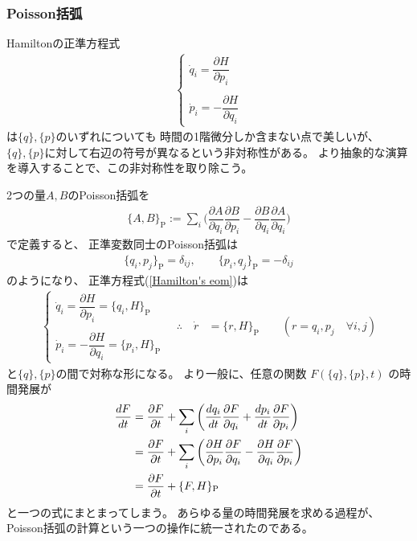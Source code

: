 \subsubsection{Poisson括弧}

Hamiltonの正準方程式
\begin{align}
  \begin{cases}
    \dot{q}_i
    = \dfrac{\partial H}
      {\partial p_i}
  \\
  \\
    \dot{p}_i
    = - \dfrac{\partial H}
      {\partial q_i}
  \end{cases}
\label{Hamilton's eom}
\end{align}
は$\{q\},\{p\}$のいずれについても
時間の1階微分しか含まない点で美しいが、
$\{q\},\{p\}$に対して右辺の符号が異なるという非対称性がある。
より抽象的な演算を導入することで、この非対称性を取り除こう。

2つの量$A,B$のPoisson括弧を
\begin{align}
    \{A, B\}_{ \mathrm{P} }
    := \sum_i \bigg(
        \dfrac{ \partial A }{ \partial q_i }
        \dfrac{ \partial B }{ \partial p_i }
    -
        \dfrac{ \partial B }{ \partial q_i }
        \dfrac{ \partial A }{ \partial q_i }
    \bigg)
\label{poisson bracket definition}
\end{align}
で定義すると、
正準変数同士のPoisson括弧は
\begin{align}
   \{q_i, p_j\}_{ \mathrm{P} }
   = \delta_{ij}
,\qquad
   \{p_i, q_j\}_{ \mathrm{P} }
   = - \delta_{ij}
\end{align}
のようになり、
正準方程式(\ref{Hamilton's eom})は
\begin{align}
    \begin{cases}
        \dot{q}_i
        = \dfrac{\partial H}{\partial p_i}
        = \{q_i, H\}_{ \mathrm{P} }
      \\
      \\
        \dot{p}_i
        = - \dfrac{\partial H}{\partial q_i}
        = \{p_i, H\}_{ \mathrm{P} }
      \end{cases}
\quad
\therefore
\quad
    \dot{r} &= \{r, H\}_{ \mathrm{P} }
\qquad
    ( r = q_i, p_j \quad\forall i, j )
\label{Hamilton e.o.m. in Poisson bracket}
\end{align}
と$\{q\},\{p\}$の間で対称な形になる。
より一般に、任意の関数
$F( \{q\},\{p\} , t )$
の時間発展が
\begin{align}
  \dfrac{ d F }{ dt }
  &=
  \dfrac{ \partial F }{ \partial t }
  +
  \sum_i
  \bigg(
    \dfrac{ d q_i }{ dt }
    \dfrac{ \partial F }{ \partial q_i }
  +
    \dfrac{ d p_i }{ dt }
    \dfrac{ \partial F }{ \partial p_i }
  \bigg)
\notag\\&=
  \dfrac{ \partial F }{ \partial t }
  +
  \sum_i
  \bigg(
    \dfrac{\partial H}{\partial p_i}
    \dfrac{ \partial F }{ \partial q_i }
  -
    \dfrac{\partial H}{\partial q_i}
    \dfrac{ \partial F }{ \partial p_i }
  \bigg)
\notag\\&=
  \dfrac{ \partial F }{ \partial t } + \{F, H\}_{ \mathrm{P} }
\label{time evolution in Poisson bracket}
\end{align}
と一つの式にまとまってしまう。
あらゆる量の時間発展を求める過程が、
Poisson括弧の計算という一つの操作に統一されたのである。

